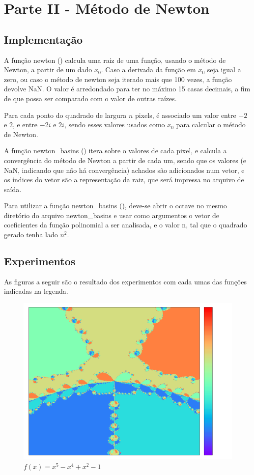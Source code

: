\documentclass{article}
\begin{document}
\section{Parte II - Método de Newton}
\subsection{Implementação}
A função newton () calcula uma raiz de uma função, usando o método de Newton, a partir de um dado $x_{0}$. Caso a derivada da função em $x_{0}$ seja igual a zero, ou caso o método de newton seja iterado mais que 100 vezes, a função devolve NaN. O valor é arredondado para ter no máximo 15 casas decimais, a fim de que possa ser comparado com o valor de outras raízes.

Para cada ponto do quadrado de largura $n$ pixels, é associado um valor entre $-2$ e $2$, e entre $-2i$ e $2i$, sendo esses valores usados como $x_{0}$ para calcular o método de Newton.

A função newton{\_}basins () itera sobre o valores de cada pixel, e calcula a convergência do método de Newton a partir de cada um, sendo que os valores (e NaN, indicando que não há convergência) achados são adicionados num vetor, e os índices do vetor são a representação da raiz, que será impressa no arquivo de saída.

Para utilizar a função newton{\_}basins (), deve-se abrir o octave no mesmo diretório do arquivo newton{\_}basins e usar como argumentos o vetor de coeficientes da função polinomial a ser analisada, e o valor n, tal que o quadrado gerado tenha lado $n^{2}$.

\subsection{Experimentos}
As figuras a seguir são o resultado dos experimentos com cada umas das funções indicadas na legenda.
\begin{figure}[!hbt]
	\centering
\includegraphics[width=0.7\linewidth]{imagens/1_-1_0_1_0_-1.png}
\caption{$f(x) = x^{5} - x^{4} + x^{2} - 1$}
\end{figure}
\end{document}
